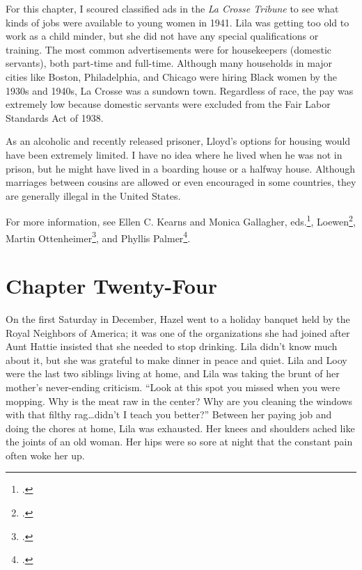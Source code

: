 \documentclass[
  letterpaper,
]{book}
\begin{document}
For this chapter, I scoured classified ads in the \emph{La Crosse
Tribune} to see what kinds of jobs were available to young women in
1941. Lila was getting too old to work as a child minder, but she did
not have any special qualifications or training. The most common
advertisements were for housekeepers (domestic servants), both part-time
and full-time. Although many households in major cities like Boston,
Philadelphia, and Chicago were hiring Black women by the 1930s and
1940s, La Crosse was a sundown town. Regardless of race, the pay was
extremely low because domestic servants were excluded from the Fair
Labor Standards Act of 1938.

As an alcoholic and recently released prisoner, Lloyd's options for
housing would have been extremely limited. I have no idea where he lived
when he was not in prison, but he might have lived in a boarding house
or a halfway house. Although marriages between cousins are allowed or
even encouraged in some countries, they are generally illegal in the
United States.

For more information, see Ellen C. Kearns and Monica Gallagher,
eds.\footnote{.},
Loewen\footnote{.},
Martin Ottenheimer\footnote{.}, and Phyllis Palmer\footnote{.}.


\chapter{Chapter Twenty-Four}\label{chapter-twenty-four}

On the first Saturday in December, Hazel went to a holiday banquet held
by the Royal Neighbors of America; it was one of the organizations she
had joined after Aunt Hattie insisted that she needed to stop drinking.
Lila didn't know much about it, but she was grateful to make dinner in
peace and quiet. Lila and Looy were the last two siblings living at
home, and Lila was taking the brunt of her mother's never-ending
criticism. ``Look at this spot you missed when you were mopping. Why is
the meat raw in the center? Why are you cleaning the windows with that
filthy rag\ldots didn't I teach you better?'' Between her paying job and
doing the chores at home, Lila was exhausted. Her knees and shoulders
ached like the joints of an old woman. Her hips were so sore at night
that the constant pain often woke her up.
\end{document}
